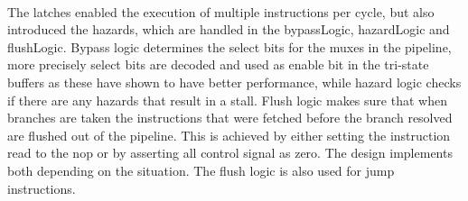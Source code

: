 \\
The latches enabled the execution of multiple instructions per cycle, but also introduced the hazards, which are handled in the bypassLogic, hazardLogic and flushLogic.  Bypass logic determines the select bits for the muxes in the pipeline, more precisely select bits are decoded and used as enable bit in the tri-state buffers as these have shown to have better performance, while hazard logic checks if there are any hazards that result in a stall. Flush logic makes sure that when branches are taken the instructions that were fetched before the branch resolved are flushed out of the pipeline. This is achieved by either setting the instruction read to the nop or by asserting all control signal as zero. The design implements both depending on the situation. The flush logic is also used for jump instructions.\\

